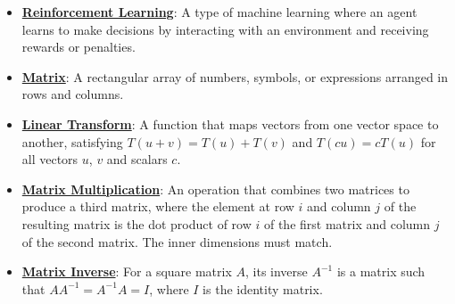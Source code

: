 \documentclass{article}%
\begin{document}
\begin{itemize}[leftmargin=*]
\item \href{https://purdue.brightspace.com/d2l/common/assets/pdfjs-d2l-dist/1.0.14-legacy/web/viewer.html?file=\%2Fcontent\%2Fenforced\%2F1095467-wl.202510.CS.24300.001\%2F02L2-Intro.pdf\%3Fou\%3D1095467\&lang=en-us\&container=d2l-fileviewer-rendered-pdf\&fullscreen=d2l-fileviewer-rendered-pdf-dialog\&height=667#page=46}{\textbf{Reinforcement Learning}}: A type of machine learning where an agent learns to make decisions by interacting with an environment and receiving rewards or penalties.%
\end{itemize}%
\begin{itemize}[leftmargin=*]%
\item \href{https://purdue.brightspace.com/d2l/common/assets/pdfjs-d2l-dist/1.0.14-legacy/web/viewer.html?file=\%2Fcontent\%2Fenforced\%2F1095467-wl.202510.CS.24300.001\%2F04L1-Linear Algebra Primer.pdf\%3Fou\%3D1095467\&lang=en-us\&container=d2l-fileviewer-rendered-pdf\&fullscreen=d2l-fileviewer-rendered-pdf-dialog\&height=667#page=4}{\textbf{Matrix}}: A rectangular array of numbers, symbols, or expressions arranged in rows and columns.%
\item \href{https://purdue.brightspace.com/d2l/common/assets/pdfjs-d2l-dist/1.0.14-legacy/web/viewer.html?file=\%2Fcontent\%2Fenforced\%2F1095467-wl.202510.CS.24300.001\%2F04L1-Linear Algebra Primer.pdf\%3Fou\%3D1095467\&lang=en-us\&container=d2l-fileviewer-rendered-pdf\&fullscreen=d2l-fileviewer-rendered-pdf-dialog\&height=667#page=5}{\textbf{Linear Transform}}: A function that maps vectors from one vector space to another, satisfying $T(u + v) = T(u) + T(v)$ and $T(cu) = cT(u)$ for all vectors $u$, $v$ and scalars $c$.%
\item \href{https://purdue.brightspace.com/d2l/common/assets/pdfjs-d2l-dist/1.0.14-legacy/web/viewer.html?file=\%2Fcontent\%2Fenforced\%2F1095467-wl.202510.CS.24300.001\%2F04L1-Linear Algebra Primer.pdf\%3Fou\%3D1095467\&lang=en-us\&container=d2l-fileviewer-rendered-pdf\&fullscreen=d2l-fileviewer-rendered-pdf-dialog\&height=667#page=14}{\textbf{Matrix Multiplication}}: An operation that combines two matrices to produce a third matrix, where the element at row $i$ and column $j$ of the resulting matrix is the dot product of row $i$ of the first matrix and column $j$ of the second matrix. The inner dimensions must match.%
\item \href{https://purdue.brightspace.com/d2l/common/assets/pdfjs-d2l-dist/1.0.14-legacy/web/viewer.html?file=\%2Fcontent\%2Fenforced\%2F1095467-wl.202510.CS.24300.001\%2F04L1-Linear Algebra Primer.pdf\%3Fou\%3D1095467\&lang=en-us\&container=d2l-fileviewer-rendered-pdf\&fullscreen=d2l-fileviewer-rendered-pdf-dialog\&height=667#page=10}{\textbf{Matrix Inverse}}: For a square matrix $A$, its inverse $A^{-1}$ is a matrix such that $AA^{-1} = A^{-1}A = I$, where $I$ is the identity matrix.%

\end{itemize}
\end{document}
